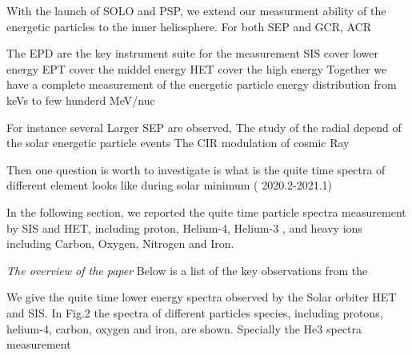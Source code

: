 
With the launch of \ac{SOLO} and \ac{PSP}, we extend our measurment ability of the energetic particles to the inner heliosphere. For both SEP and GCR, ACR

The EPD are the key instrument suite for the measurement
SIS cover lower energy 
EPT cover the middel energy 
HET cover the high energy 
Together we have a complete measurement of the energetic particle energy distribution from keVs to few hunderd MeV/nuc

For instance several Larger SEP are observed, 
The study of the radial depend of the solar energetic particle events
The CIR modulation of cosmic Ray

Then one question is worth to investigate is what is the quite time spectra of different element looks like during solar minimum ( 2020.2-2021.1)

In the following section, we reported the quite time particle spectra measurement by  SIS and HET, including proton, Helium-4, Helium-3 , and heavy ions including Carbon, Oxygen, Nitrogen and Iron.

\textit{The overview of the paper}
Below is a list of the key observations from the \citep{Mason-2021-SolOQuietTime}

We give the quite time lower energy spectra observed by the Solar orbiter HET and SIS. 
In Fig.2 the spectra of different particles species, including protons, helium-4, carbon, oxygen and iron, are shown.
Specially the He3 spectra measurement 
\


